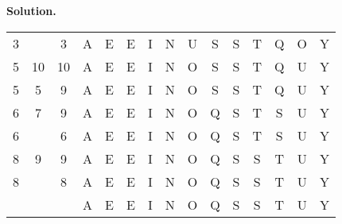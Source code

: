 \documentclass[12pt, a4paper]{article}
\newenvironment{sol}[1][Solution]
{\par\medskip\noindent \textbf{#1.} }
{\medskip}
\begin{document}
\begin{sol}
\begin{center}
\begin{tabular}{ccc|cccccccccccc}
				{\color{gray}3} & {} & {\color{gray}3} & {\color{gray}A} & {\color{gray} E} & {\color{gray} E} & {\color{red} I} & {\color{gray} N} & {\color{gray} U} & {\color{gray} S} & {\color{gray} S} & {\color{gray} T} & {\color{gray} Q} & {\color{gray} O} & {\color{gray} Y}\\
				
				{\color{black}5} & {\color{red}10} & {\color{black}10} & {\color{gray}A} & {\color{gray} E} & {\color{gray} E} & {\color{gray} I} & {\color{gray} N} & {\color{black} O} & {\color{black} S} & {\color{black} S} & {\color{black} T} & {\color{black} Q} & {\color{red} U} & {\color{gray} Y}\\
				
				{\color{black}5} & {\color{red}5} & {\color{black}9} & {\color{gray}A} & {\color{gray} E} & {\color{gray} E} & {\color{gray} I} & {\color{gray} N} & {\color{red} O} & {\color{black} S} & {\color{black} S} & {\color{black} T} & {\color{black} Q} & {\color{gray} U} & {\color{gray} Y}\\
				
				{\color{black}6} & {\color{red}7} & {\color{black}9} & {\color{gray}A} & {\color{gray} E} & {\color{gray} E} & {\color{gray} I} & {\color{gray} N} & {\color{gray} O} & {\color{black} Q} & {\color{red} S} & {\color{black} T} & {\color{black} S} & {\color{gray} U} & {\color{gray} Y}\\
				
				{\color{gray}6} & {\color{red}} & {\color{gray}6} & {\color{gray}A} & {\color{gray} E} & {\color{gray} E} & {\color{gray} I} & {\color{gray} N} & {\color{gray} O} & {\color{red} Q} & {\color{gray} S} & {\color{gray} T} & {\color{gray} S} & {\color{gray} U} & {\color{gray} Y}\\
				
				{\color{black}8} & {\color{red}9} & {\color{black} 9} & {\color{gray}A} & {\color{gray} E} & {\color{gray} E} & {\color{gray} I} & {\color{gray} N} & {\color{gray} O} & {\color{gray} Q} & {\color{gray} S} & {\color{black} S} & {\color{red}T} & {\color{gray} U} & {\color{gray} Y}\\
				
				{\color{gray}8} & {\color{red}} & {\color{gray} 8} & {\color{gray}A} & {\color{gray} E} & {\color{gray} E} & {\color{gray} I} & {\color{gray} N} & {\color{gray} O} & {\color{gray} Q} & {\color{gray} S} & {\color{red} S} & {\color{gray}T} & {\color{gray} U} & {\color{gray} Y}\\
				
				{} & {} & {} & {\color{gray}A} & {\color{black} E} & {\color{black} E} & {\color{black} I} & {\color{black} N} & {\color{black} O} & {\color{black} Q} & {\color{black} S} & {\color{black} S} & {\color{black}T} & {\color{black} U} & {\color{black} Y}\\
			\end{tabular}
		\end{center}
	\end{sol}
\end{document}
